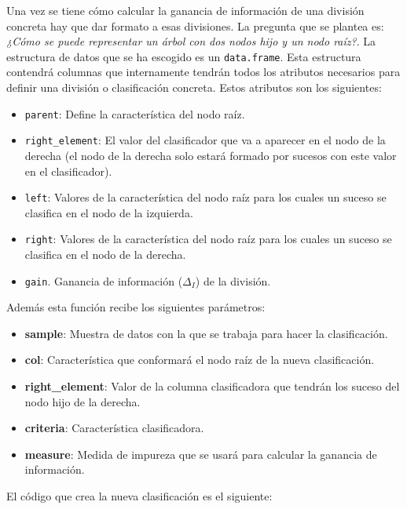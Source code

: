 \documentclass[12pt]{report}\usepackage[]{graphicx}\usepackage[dvipsnames]{xcolor}
\begin{document}
	 			Una vez se tiene cómo calcular la ganancia de información de una división concreta hay que dar formato a esas divisiones. La pregunta que se plantea es: \textit{¿Cómo se puede representar un árbol con dos nodos hijo y un nodo raíz?}. La estructura de datos que se ha escogido es un \texttt{data.frame}. Esta estructura contendrá columnas que internamente tendrán todos los atributos necesarios para definir una división o clasificación concreta. Estos atributos son los siguientes:
	 			
	 			\begin{itemize}
	 				\item \texttt{parent}: Define la característica del nodo raíz.
	 				\item \texttt{right\_element}: El valor del clasificador que va a aparecer en el nodo de la derecha (el nodo de la derecha solo estará formado por sucesos con este valor en el clasificador).
	 				\item \texttt{left}: Valores de la característica del nodo raíz para los cuales un suceso se clasifica en el nodo de la izquierda.
	 				\item \texttt{right}: Valores de la característica del nodo raíz para los cuales un suceso se clasifica en el nodo de la derecha.
	 				\item \texttt{gain}. Ganancia de información ($\Delta_I$) de la división.
	 			\end{itemize}
	 			
	 			
	 			\noindent Además esta función recibe los siguientes parámetros:
	 			
	 			\begin{itemize}
	 				\item \textbf{sample}: Muestra de datos con la que se trabaja para hacer la clasificación.
	 				\item \textbf{col}: Característica que conformará el nodo raíz de la nueva clasificación.
	 				\item \textbf{right\_element}: Valor de la columna clasificadora que tendrán los suceso del nodo hijo de la derecha.
	 				\item \textbf{criteria}: Característica clasificadora.
	 				\item \textbf{measure}: Medida de impureza que se usará para calcular la ganancia de información.
	 			\end{itemize}
	 			
	 			\noindent El código que crea la nueva clasificación es el siguiente:
	 			
\end{document}

